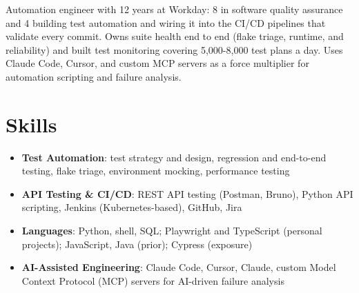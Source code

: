 \documentclass[10pt,letterpaper,sans]{moderncv}
\begin{document}
\makecvtitle
\vspace{-6pt}

\small{Automation engineer with 12 years at Workday: 8 in software quality assurance and 4 building test automation and wiring it into the CI/CD pipelines that validate every commit. Owns suite health end to end (flake triage, runtime, and reliability) and built test monitoring covering 5,000-8,000 test plans a day. Uses Claude Code, Cursor, and custom MCP servers as a force multiplier for automation scripting and failure analysis.}

\section{Skills}
\vspace{1pt}
\begin{itemize}
\item \textbf{Test Automation}: test strategy and design, regression and end-to-end testing, flake triage, environment mocking, performance testing
\item \textbf{API Testing \& CI/CD}: REST API testing (Postman, Bruno), Python API scripting, Jenkins (Kubernetes-based), GitHub, Jira
\item \textbf{Languages}: Python, shell, SQL; Playwright and TypeScript (personal projects); JavaScript, Java (prior); Cypress (exposure)
\item \textbf{AI-Assisted Engineering}: Claude Code, Cursor, Claude, custom Model Context Protocol (MCP) servers for AI-driven failure analysis
\end{itemize}
\end{document}
